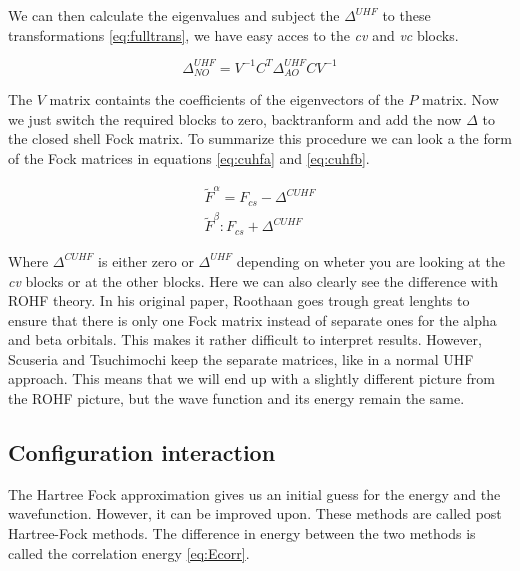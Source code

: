 \documentclass[twoside,twocolumn,9pt]{article}
\begin{document}
We can then calculate the eigenvalues and subject the $\Delta^{UHF}$ to these transformations \eqref{eq:fulltrans}, we have easy acces to the \textit{cv} and \textit{vc} blocks.

\begin{equation}\label{eq:fulltrans}
  \Delta_{NO}^{UHF} = V^{-1} C^T \Delta^{UHF}_{AO} C V^{-1}
\end{equation}

The $V$ matrix containts the coefficients of the eigenvectors of the $P$ matrix. Now we just switch the required blocks to zero, backtranform and add the now $\Delta$ to the closed
shell Fock matrix. To summarize this procedure we can look a the form of the Fock matrices in equations \eqref{eq:cuhfa} and \eqref{eq:cuhfb}.

\begin{subequations}
  \begin{align}
    \label{eq:cuhfa}
    \tilde{F}^\alpha = F_{cs} - \Delta^{CUHF} \\
    \label{eq:cuhfb}
    \tilde{F}^\beta : F_{cs} + \Delta^{CUHF}
  \end{align}
\end{subequations}

Where $\Delta^{CUHF}$ is either zero or $\Delta^{UHF}$ depending on wheter you are looking at the \textit{cv} blocks or at the other blocks. Here we can also clearly see the 
difference with ROHF theory. In his original paper, Roothaan goes trough great lenghts to ensure that there is only one Fock matrix instead of separate ones for the alpha and 
beta orbitals\cite{Roothaan1960}. This makes it rather difficult to interpret results\cite{Scuseria2010}. However, Scuseria and Tsuchimochi keep the separate matrices, like in a 
normal UHF approach. This means that we will end up with a slightly different picture from the ROHF picture, but the wave function and its energy remain the same\cite{Scuseria2010}. 

\subsection{Configuration interaction}
\label{subsec:cistheory}

The Hartree Fock approximation gives us an initial guess for the energy and the wavefunction. However, it can be improved upon. These methods are called post Hartree-Fock methods.
The difference in energy between the two methods is called the correlation energy \eqref{eq:Ecorr}.
\end{document}

